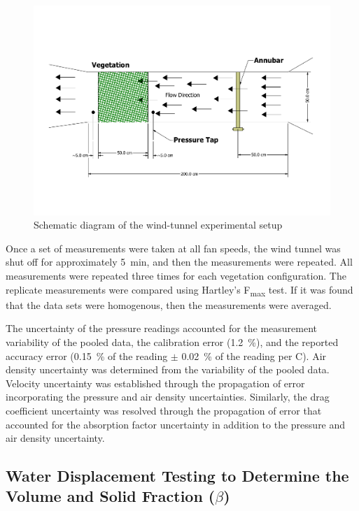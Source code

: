 \documentclass[12pt]{article}
\begin{document}
\begin{figure} [!]
	\centering 	\includegraphics[width=\textwidth,keepaspectratio]{Drawing1.pdf}
	\caption{Schematic diagram of the wind-tunnel experimental setup}
	\label{fig:WindtunnelSch}
\end{figure}

Once a set of measurements were taken at all fan speeds, the wind tunnel was shut off for approximately 5~\si{min}, and then the measurements were repeated. All measurements were repeated three times for each vegetation configuration. The replicate measurements were compared using Hartley's F\textsubscript{max} test. If it was found that the data sets were homogenous, then the measurements were averaged.

The uncertainty of the pressure readings accounted for the measurement variability of the pooled data, the calibration error (1.2~\%), and the reported accuracy error (0.15~\% of the reading $\pm$ 0.02~\% of the reading per \textdegree C). Air density uncertainty was determined from the variability of the pooled data. Velocity uncertainty was established through the propagation of error incorporating the pressure and air density uncertainties. Similarly, the drag coefficient uncertainty was resolved through the propagation of error that accounted for the absorption factor uncertainty in addition to the pressure and air density uncertainty.


\subsection{Water Displacement Testing to Determine the Volume and Solid Fraction ($\beta$)}
\label{ssec:headingscap}
\end{document}
